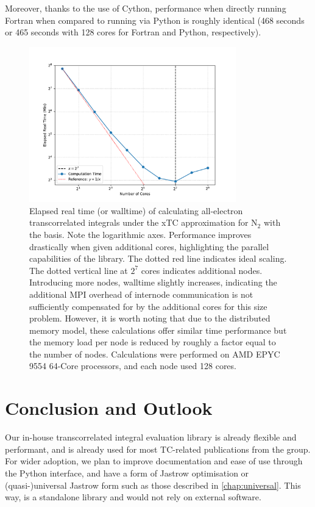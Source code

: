 Moreover, thanks to the use of Cython, performance when directly running Fortran when compared to running via Python is roughly identical (468 seconds or 465 seconds with 128 cores for Fortran and Python, respectively).

\begin{figure}[htbp]
    \centering
    \includegraphics[width=0.8\textwidth]{figures/pytchint/ncore_walltime}
    \caption{Elapsed real time (or walltime) of calculating all-electron transcorrelated integrals under the \gls{xTC} approximation for N$_2$ with the \avqz basis. Note the logarithmic axes. Performance improves drastically when given additional cores, highlighting the parallel capabilities of the \pytchint library. The dotted red line indicates ideal scaling. The dotted vertical line at $2^7$ cores indicates additional nodes. Introducing more nodes, walltime slightly increases, indicating the additional MPI overhead of internode communication is not sufficiently compensated for by the additional cores for this size problem. However, it is worth noting that due to the distributed memory model, these calculations offer similar time performance but the memory load per node is reduced by roughly a factor equal to the number of nodes. Calculations were performed on AMD EPYC 9554 64-Core processors, and each node used 128 cores.}
    \label{fig:parallel-performance}
\end{figure}

\section{Conclusion and Outlook}

Our in-house transcorrelated integral evaluation library is already flexible and performant, and is already used for most TC-related publications from the group. For wider adoption, we plan to improve documentation and ease of use through the Python interface, and have a form of Jastrow optimisation or (quasi-)universal Jastrow form such as those described in \autoref{chap:universal}. This way, \pytchint is a standalone library and would not rely on external software.

